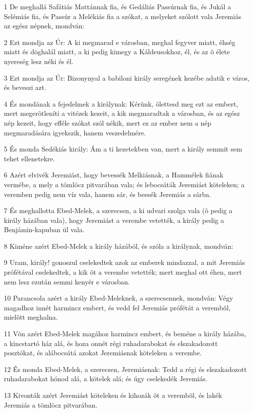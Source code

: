 \par 1 De meghallá Safátiás Mattánnak fia, és Gedáliás Passúrnak fia, és Jukál a Selémiás fia, és Passúr a Melékiás fia a szókat, a melyeket szólott vala Jeremiás az egész népnek, mondván:
\par 2 Ezt mondja az Úr: A ki megmarad e városban, meghal fegyver miatt, éhség miatt és döghalál miatt, a ki pedig kimegy a Káldeusokhoz, él, és az õ élete nyereség lesz néki és él.
\par 3 Ezt mondja az Úr: Bizonynyal a babiloni király seregének kezébe adatik e város, és beveszi azt.
\par 4 És mondának a fejedelmek a királynak: Kérünk, ölettesd meg ezt az embert, mert megerõtleníti a vitézek kezeit, a kik megmaradtak a városban, és az egész nép kezeit, hogy efféle szókat szól nékik, mert ez az ember nem a nép megmaradására igyekszik, hanem veszedelmére.
\par 5 És monda Sedékiás király: Ám a ti kezetekben van, mert a király semmit sem tehet ellenetekre.
\par 6 Azért elvivék Jeremiást, hogy bevessék Melkiásnak, a Hammélek fiának vermébe, a mely a tömlöcz pitvarában vala; és lebocsáták Jeremiást köteleken; a veremben pedig nem víz vala, hanem sár, és beesék Jeremiás a sárba.
\par 7 És meghallotta Ebed-Melek, a szerecsen, a ki udvari szolga vala (õ pedig a király házában vala), hogy Jeremiást a verembe vetették, a király pedig a Benjámin-kapuban ül vala.
\par 8 Kiméne azért Ebed-Melek a király házából, és szóla a királynak, mondván:
\par 9 Uram, király! gonoszul cselekedtek azok az emberek mindazzal, a mit Jeremiás prófétával cselekedtek, a kik õt a verembe vetették; mert meghal ott éhen, mert nem lesz ezután semmi kenyér e városban.
\par 10 Parancsola azért a király Ebed-Meleknek, a szerecsennek, mondván: Végy magadhoz innét harmincz embert, és vedd fel Jeremiás prófétát a verembõl, mielõtt meghalna.
\par 11 Võn azért Ebed-Melek magához harmincz embert, és beméne a király házába, a kincstartó ház alá, és hoza onnét régi ruhadarabokat és elszakadozott posztókat, és alábocsátá azokat Jeremiásnak köteleken a verembe.
\par 12 És monda Ebed-Melek, a szerecsen, Jeremiásnak: Tedd a régi és elszakadozott ruhadarabokat hónod alá, a kötelek alá; és úgy cselekedék Jeremiás.
\par 13 Kivonták azért Jeremiást köteleken és kihozák õt a verembõl, és lakék Jeremiás a tömlöcz pitvarában.
